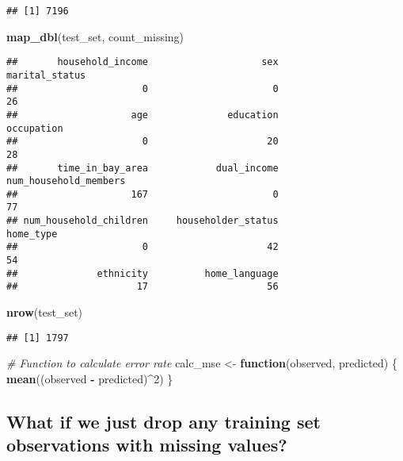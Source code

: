 \documentclass[]{article}
\newenvironment{Shaded}{\begin{snugshade}}{\end{snugshade}}
\newcommand{\KeywordTok}[1]{\textcolor[rgb]{0.13,0.29,0.53}{\textbf{#1}}}
\newcommand{\DecValTok}[1]{\textcolor[rgb]{0.00,0.00,0.81}{#1}}
\newcommand{\StringTok}[1]{\textcolor[rgb]{0.31,0.60,0.02}{#1}}
\newcommand{\CommentTok}[1]{\textcolor[rgb]{0.56,0.35,0.01}{\textit{#1}}}
\newcommand{\ControlFlowTok}[1]{\textcolor[rgb]{0.13,0.29,0.53}{\textbf{#1}}}
\newcommand{\OperatorTok}[1]{\textcolor[rgb]{0.81,0.36,0.00}{\textbf{#1}}}
\newcommand{\NormalTok}[1]{#1}
\begin{document}
\begin{verbatim}
## [1] 7196
\end{verbatim}

\begin{Shaded}
\begin{Highlighting}[]
\KeywordTok{map_dbl}\NormalTok{(test_set, count_missing)}
\end{Highlighting}
\end{Shaded}

\begin{verbatim}
##       household_income                    sex         marital_status 
##                      0                      0                     26 
##                    age              education             occupation 
##                      0                     20                     28 
##       time_in_bay_area            dual_income  num_household_members 
##                    167                      0                     77 
## num_household_children     householder_status              home_type 
##                      0                     42                     54 
##              ethnicity          home_language 
##                     17                     56
\end{verbatim}

\begin{Shaded}
\begin{Highlighting}[]
\KeywordTok{nrow}\NormalTok{(test_set)}
\end{Highlighting}
\end{Shaded}

\begin{verbatim}
## [1] 1797
\end{verbatim}

\begin{Shaded}
\begin{Highlighting}[]
\CommentTok{# Function to calculate error rate}
\NormalTok{calc_mse <-}\StringTok{ }\ControlFlowTok{function}\NormalTok{(observed, predicted) \{}
  \KeywordTok{mean}\NormalTok{((observed }\OperatorTok{-}\StringTok{ }\NormalTok{predicted)}\OperatorTok{^}\DecValTok{2}\NormalTok{)}
\NormalTok{\}}
\end{Highlighting}
\end{Shaded}

\subsection{What if we just drop any training set observations with
missing
values?}\label{what-if-we-just-drop-any-training-set-observations-with-missing-values}
\end{document}
